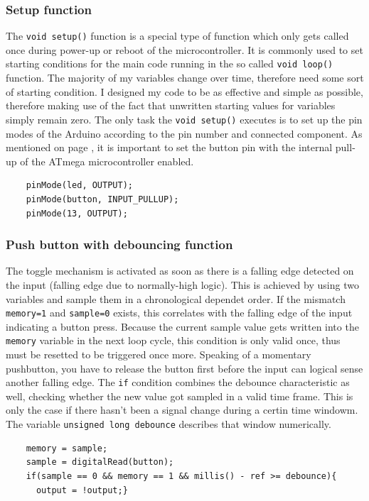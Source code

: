 \documentclass{scrartcl}                    %
\begin{document}
    \subsubsection{Setup function}
    The \texttt{void setup()} function is a special type of function which only gets called once during power-up or reboot of the microcontroller. It is commonly used to set starting conditions for the main code running in the so called \texttt{void loop()} function. The majority of my variables change over time, therefore need some sort of starting condition. I designed my code to be as effective and simple as possible, therefore making use of the fact that unwritten starting values for variables simply remain zero. The only task the \texttt{void setup()} executes is to set up the pin modes of the Arduino according to the pin number and connected component. As mentioned on page \pageref{schem} , it is important to set the button pin with the internal pull-up of the ATmega microcontroller enabled.
    
    \begin{lstlisting}
    pinMode(led, OUTPUT);
    pinMode(button, INPUT_PULLUP); 
    pinMode(13, OUTPUT);  
    \end{lstlisting}

    
    \subsubsection{Push button with debouncing function}
    The toggle mechanism is activated as soon as there is a falling edge detected on the input (falling edge due to normally-high logic). This is achieved by using two variables and sample them in a chronological dependet order. If the mismatch \texttt{memory=1} and \texttt{sample=0} exists, this correlates with the falling edge of the input indicating a button press. Because the current sample value gets written into the \texttt{memory} variable in the next loop cycle, this condition is only valid once, thus must be resetted to be triggered once more. Speaking of a momentary pushbutton, you have to release the button first before the input can logical sense another falling edge. The \texttt{if} condition combines the debounce characteristic as well, checking whether the new value got sampled in a valid time frame. This is only the case if there hasn't been a signal change during a certin time windowm. The variable \texttt{unsigned long debounce} describes that window numerically. 
    
    \begin{lstlisting}
    memory = sample;                                                     
    sample = digitalRead(button);                                       
    if(sample == 0 && memory == 1 && millis() - ref >= debounce){       
      output = !output;}                                               
    \end{lstlisting}
\end{document}
